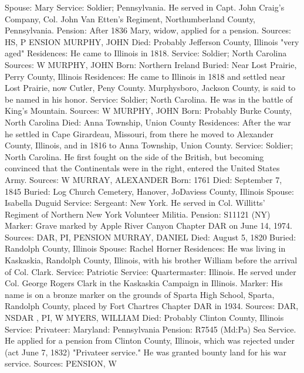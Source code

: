 Spouse: Mary 
Service: Soldier; Pennsylvania. He served in Capt. John Craig's Company, Col. John Van Etten's Regiment, Northumberland County, Pennsylvania.
Pension: After 1836 Mary, widow, applied for a pension.
Sources: HS, P ENSION 
MURPHY, JOHN
Died: Probably Jefferson County, Illinois "very aged"
Residences: He came to Illinois in 1818.
Service: Soldier; North Carolina
Sources: W 
MURPHY, JOHN
Born: Northern Ireland
Buried: Near Lost Prairie, Perry County, Illinois
Residences: He came to Illinois in 1818 and settled near Lost Prairie, now 
Cutler, Peny County. Murphysboro, Jackson County, is said to be named in his honor.
Service: Soldier; North Carolina. He was in the battle of King's Mountain.
Sources: W 
MURPHY, JOHN 
Born: Probably Burke County, North Carolina 
Died: Anna Township, Union County
Residences: After the war he settled in Cape Girardeau, Missouri, from there he moved to Alexander County, Illinois, and in 1816 to Anna Township, Union County.
Service: Soldier; North Carolina. He first fought on the side of the British, but becoming convinced that the Continentals were in the right, entered the United States Army.
Sources: W 
MURRAY, ALEXANDER 
Born: 1761 
Died: September 7, 1845 
Buried: Log Church Cemetery, Hanover, JoDaviess County, Illinois 
Spouse: Isabella Duguid 
Service: Sergeant: New York. He served in Col. Willitts’ Regiment of Northern New York Volunteer Militia.
Pension: S11121 (NY)
Marker: Grave marked by Apple River Canyon Chapter DAR on June 14, 1974.
Sources: DAR, PI, PENSION 
MURRAY, DANIEL 
Died: August 5, 1820
Buried: Randolph County, Illinois
Spouse: Rachel Horner
Residences: He was living in Kaskaskia, Randolph County, Illinois, with his brother William before the arrival of Col. Clark.
Service: Patriotic
Service: Quartermaster: Illinois. He served under Col. George Rogers Clark in the Kaskaskia Campaign in Illinois.
Marker: His name is on a bronze marker on the grounds of Sparta High School, Sparta, Randolph County, placed by Fort Chartres Chapter DAR in 1934. 
Sources: DAR, NSDAR , PI,  W 
MYERS, WILLIAM 
Died: Probably Clinton County, Illinois
Service: Privateer: Maryland: Pennsylvania
Pension: R7545 (Md:Pa) Sea Service. He applied for a pension from Clinton 
County, Illinois, which was rejected under (act June 7, 1832) "Privateer service." He was granted bounty land for his war service.
Sources: PENSION, W 

